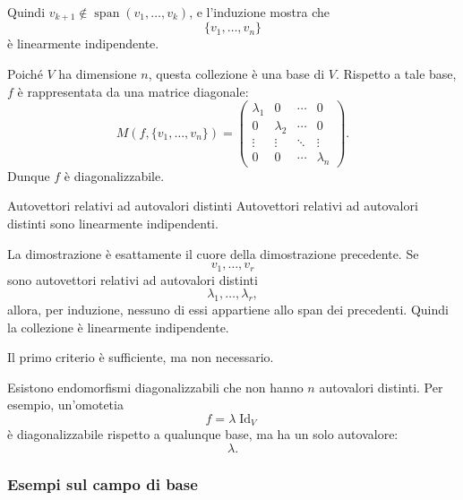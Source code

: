 \documentclass[a4paper]{article}
\begin{document}
\begin{snippetproof}{}
    Quindi \(v_{k+1}\notin\operatorname{span}(v_1,\ldots,v_k)\), e l'induzione mostra che
    \[
        \{v_1,\ldots,v_n\}
    \]
    è linearmente indipendente.

    Poiché \(V\) ha dimensione \(n\), questa collezione è una base di \(V\). Rispetto a tale base, \(f\) è rappresentata da una matrice diagonale:
    \[
        M(f,\{v_1,\ldots,v_n\})
        =
        \begin{pmatrix}
            \lambda_1 & 0 & \cdots & 0\\
            0 & \lambda_2 & \cdots & 0\\
            \vdots & \vdots & \ddots & \vdots\\
            0 & 0 & \cdots & \lambda_n
        \end{pmatrix}.
    \]
    Dunque \(f\) è diagonalizzabile.
\end{snippetproof}

\begin{snippetproposition}{Autovettori relativi ad autovalori distinti}
    Autovettori relativi ad autovalori distinti sono linearmente indipendenti.
\end{snippetproposition}

\begin{snippetproof}{}
    La dimostrazione è esattamente il cuore della dimostrazione precedente. Se
    \[
        v_1,\ldots,v_r
    \]
    sono autovettori relativi ad autovalori distinti
    \[
        \lambda_1,\ldots,\lambda_r,
    \]
    allora, per induzione, nessuno di essi appartiene allo span dei precedenti. Quindi la collezione è linearmente indipendente.
\end{snippetproof}

\begin{snippetremark}{}
    Il primo criterio è sufficiente, ma non necessario.

    Esistono endomorfismi diagonalizzabili che non hanno \(n\) autovalori distinti. Per esempio, un'omotetia
    \[
        f=\lambda\operatorname{Id}_V
    \]
    è diagonalizzabile rispetto a qualunque base, ma ha un solo autovalore:
    \[
        \lambda.
    \]
\end{snippetremark}

\subsubsection{Esempi sul campo di base}
\end{document}
